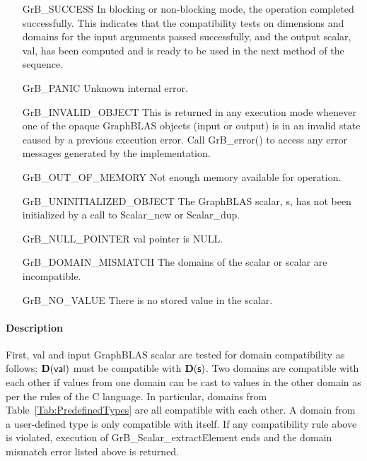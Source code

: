 \begin{itemize}[leftmargin=2.1in]
    \item[{\sf GrB\_SUCCESS}]  In blocking or non-blocking mode, the operation 
    completed successfully. This indicates that the compatibility tests on 
    dimensions and domains for the input arguments passed successfully, and
    the output scalar, {\sf val}, has been computed and is ready to be used in 
    the next method of the sequence.

    \item[{\sf GrB\_PANIC}]   Unknown internal error.
    
    \item[{\sf GrB\_INVALID\_OBJECT}] This is returned in any execution mode 
    whenever one of the opaque GraphBLAS objects (input or output) is in an invalid 
    state caused by a previous execution error.  Call {\sf GrB\_error()} to access 
    any error messages generated by the implementation.

    \item[{\sf GrB\_OUT\_OF\_MEMORY}]  Not enough memory available for operation.
    
    \item[{\sf GrB\_UNINITIALIZED\_OBJECT}]  The GraphBLAS scalar, {\sf s}, has 
    not been initialized by a call to {\sf Scalar\_new} or {\sf Scalar\_dup}.
    
    \item[{\sf GrB\_NULL\_POINTER}]    {\sf val} pointer is {\sf NULL}.
    
    \item[{\sf GrB\_DOMAIN\_MISMATCH}]     The domains of the scalar or scalar
    are incompatible.

    \item[{\sf GrB\_NO\_VALUE}]  There is no stored value in the scalar.
\end{itemize}

\paragraph{Description}

First, {\sf val} and input GraphBLAS scalar are tested for domain compatibility as follows:
$\mathbf{D}({\sf val})$ must be compatible with $\mathbf{D}({\sf s})$. Two domains 
are compatible with each other if values from one domain can be cast to values 
in the other domain as per the rules of the C language. In particular, domains 
from Table~\ref{Tab:PredefinedTypes} are all compatible with each other. A domain 
from a user-defined type is only compatible with itself. If any compatibility 
rule above is violated, execution of {\sf GrB\_Scalar\_extractElement} ends and 
the domain mismatch error listed above is returned.


